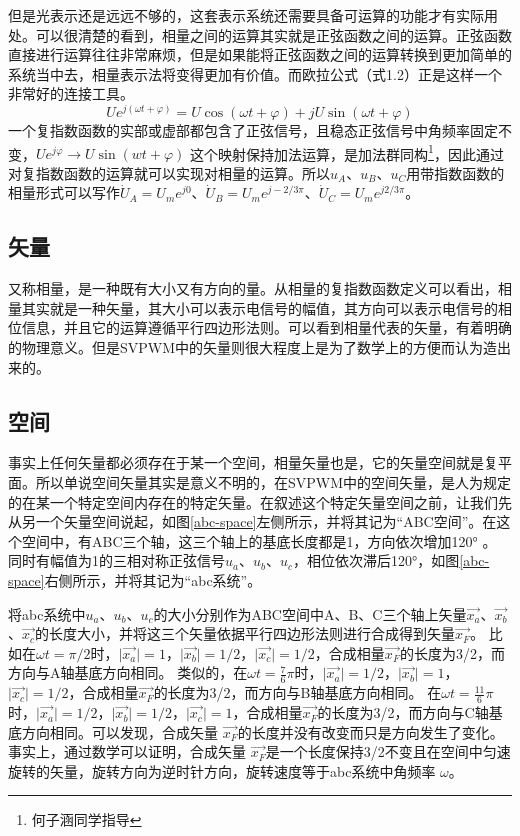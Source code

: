 \documentclass{ctexart}
\numberwithin{equation}{section}
\begin{document}
但是光表示还是远远不够的，这套表示系统还需要具备可运算的功能才有实际用处。可以很清楚的看到，相量之间的运算其实就是正弦函数之间的运算。正弦函数直接进行运算往往非常麻烦，但是如果能将正弦函数之间的运算转换到更加简单的系统当中去，相量表示法将变得更加有价值。而欧拉公式（式1.2）正是这样一个非常好的连接工具。
\begin{equation}
  Ue^{j(\omega t + \varphi)} = U\cos (\omega t + \varphi) +jU\sin (\omega t + \varphi)
\end{equation}
一个复指数函数的实部或虚部都包含了正弦信号，且稳态正弦信号中角频率固定不变，$Ue^{j\varphi} \to U\sin(wt+\varphi)$ 这个映射保持加法运算，是加法群同构\footnote{何子涵同学指导}，因此通过对复指数函数的运算就可以实现对相量的运算。所以$ u_A $、$ u_B $、$ u_C $用带指数函数的相量形式可以写作$ \dot U_A = U_m e^{j0} $、$ \dot U_B = U_m e^{j-2/3\pi} $、$ \dot U_C = U_m e^{j2/3\pi} $。

\subsection{矢量}
又称相量，是一种既有大小又有方向的量。从相量的复指数函数定义可以看出，相量其实就是一种矢量，其大小可以表示电信号的幅值，其方向可以表示电信号的相位信息，并且它的运算遵循平行四边形法则。可以看到相量代表的矢量，有着明确的物理意义。但是SVPWM中的矢量则很大程度上是为了数学上的方便而认为造出来的。

\subsection{空间}
事实上任何矢量都必须存在于某一个空间，相量矢量也是，它的矢量空间就是复平面。所以单说空间矢量其实是意义不明的，在SVPWM中的空间矢量，是人为规定的在某一个特定空间内存在的特定矢量。在叙述这个特定矢量空间之前，让我们先从另一个矢量空间说起，如图\ref{abc-space}左侧所示，并将其记为“ABC空间”。在这个空间中，有ABC三个轴，这三个轴上的基底长度都是1，方向依次增加\ang{120} 。
同时有幅值为1的三相对称正弦信号$u_a$、$u_b$、$u_c$，相位依次滞后\ang{120}，如图\ref{abc-space}右侧所示，并将其记为“abc系统”。

将abc系统中$u_a$、$u_b$、$u_c$的大小分别作为ABC空间中A、B、C三个轴上矢量$\vec{x_{a}}$、$\vec{x_{b}}$、$\vec{x_{c}}$的长度大小，并将这三个矢量依据平行四边形法则进行合成得到矢量$\vec{x_F}$。
比如在$ \omega t = \pi /2 $时，$ \vert \vec{x_a} \vert = 1 $，$ \vert \vec{x_b} \vert = 1/2 $，$ \vert \vec{x_c} \vert = 1/2 $，合成相量$  \vec{x_F} $的长度为3/2，而方向与A轴基底方向相同。
类似的，在$ \omega t = \frac{7}{6}\pi $时，$ \vert \vec{x_a} \vert = 1/2 $，$ \vert \vec{x_b} \vert = 1 $，$ \vert \vec{x_c} \vert = 1/2 $，合成相量$  \vec{x_F} $的长度为3/2，而方向与B轴基底方向相同。
在$ \omega t = \frac{11}{6}\pi $时，$ \vert \vec{x_a} \vert = 1/2 $，$ \vert \vec{x_b} \vert = 1/2 $，$ \vert \vec{x_c} \vert = 1 $，合成相量$  \vec{x_F} $的长度为3/2，而方向与C轴基底方向相同。可以发现，合成矢量 $ \vec{x_F} $的长度并没有改变而只是方向发生了变化。事实上，通过数学可以证明，合成矢量 $ \vec{x_F} $是一个长度保持3/2不变且在空间中匀速旋转的矢量，旋转方向为逆时针方向，旋转速度等于abc系统中角频率 $ \omega $。
\end{document}
